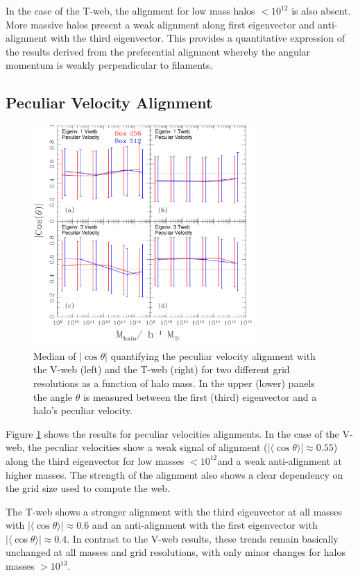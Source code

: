 \documentclass[useAMS,usenatbib]{mn2e}
\newcommand{\hMsun}{{\ifmmode{h^{-1}{\rm
        {M_{\odot}}}}\else{$h^{-1}{\rm{M_{\odot}}}$~}\fi}}
\newcommand{\Msun}{{\ifmmode{{\rm {M_{\odot}}}}\else{${\rm{M_{\odot}}}$}\fi}}
\newcommand{\muavg}{\vert\langle\cos\theta\rangle\vert}
\begin{document}
In the case of the T-web, the alignment for low mass halos $<10^{12}$\hMsun
is also absent. More massive halos present a weak alignment along
first eigenvector and anti-alignment with the third eigenvector. This
provides a quantitative expression of the results derived from the
preferential alignment whereby the angular momentum is weakly
perpendicular to filaments.

\subsection{Peculiar Velocity Alignment}

\begin{figure}
\includegraphics[width=0.75\textwidth]{Fig4.pdf}
\caption{Median of $\vert\cos\theta\vert$ quantifying the peculiar velocity
  alignment with the V-web (left) and the T-web (right) for two different
  grid resolutions as a function of halo mass. In the upper (lower)
  panels the angle $\theta$ is measured between the first (third)
  eigenvector and a halo's peculiar velocity.
\label{fig:velocity_alignment}}
\end{figure}

Figure \ref{fig:velocity_alignment} shows the results for peculiar
velocities alignments. In the case of the V-web, the peculiar
velocities show a weak signal of alignment ($\muavg\approx0.55$)
along the third eigenvector for low masses $<10^{12}$\Msun and a weak
anti-alignment at higher masses. The strength of the alignment also shows
a clear dependency on the grid size used to compute the web.

The T-web shows a stronger alignment with the third eigenvector at all
masses with $\muavg\approx0.6$ and an anti-alignment with the first
eigenvector with $\muavg\approx 0.4$. In contrast to the V-web results,
these trends remain basically unchanged at all masses and grid
resolutions, with only minor changes for halos masses $>10^{13}$\hMsun.
\end{document}
